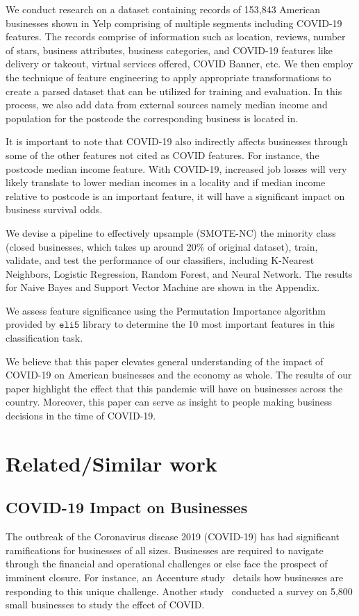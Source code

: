 \documentclass{article}
\begin{document}
We conduct research on a dataset containing records of 153,843 American businesses shown in Yelp comprising of multiple segments including COVID-19 features. The records comprise of information such as location, reviews, number of stars, business attributes, business categories, and COVID-19 features like delivery or takeout, virtual services offered, COVID Banner, etc. We then employ the technique of feature engineering to apply appropriate transformations to create a parsed dataset that can be utilized for training and evaluation. In this process, we also add data from external sources namely median income and population for the postcode the corresponding business is located in.  

It is important to note that COVID-19 also indirectly affects businesses through some of the other features not cited as COVID features. For instance, the postcode median income feature. With COVID-19, increased job losses will very likely translate to lower median incomes in a locality and if median income relative to postcode is an important feature, it will have a significant impact on business survival odds.

We devise a pipeline to effectively upsample (SMOTE-NC) the minority class (closed businesses, which takes up around 20\% of original dataset), train, validate, and test the performance of our classifiers, including K-Nearest Neighbors, Logistic Regression, Random Forest, and Neural Network.  The  results for Naive Bayes and Support Vector Machine are shown in the Appendix.

We assess feature significance using the Permutation Importance algorithm provided by $\texttt{eli5} $ library to determine the 10 most important features in this classification task. 
 
We believe that this paper elevates general understanding of the impact of COVID-19 on American businesses and the economy as whole. The results of our paper highlight the effect that this pandemic will have on businesses across the country. Moreover, this paper can serve as insight to people making business decisions in the time of COVID-19.


\section{Related/Similar work}
\subsection{COVID-19 Impact on Businesses}
The outbreak of the Coronavirus disease 2019 (COVID-19) has had significant ramifications for businesses of all sizes. Businesses are required to navigate through the financial and operational challenges or else face the prospect of imminent closure. For instance, an Accenture study~\cite{covid-impact1} details how businesses are responding to this unique challenge. Another study~\cite{bartik2020small} conducted a survey on 5,800 small businesses to study the effect of COVID.
\end{document}
